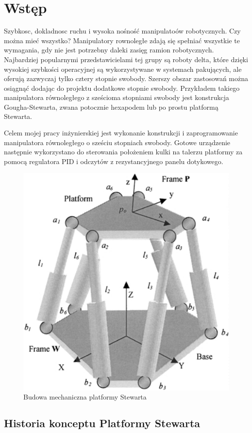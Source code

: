\newpage %


\section[Wstęp]{Wstęp}

Szybkosc, dokladnosc ruchu i wysoka nośność manipulatoów robotycznych. Czy można mieć wszystko?
Manipulatory rownoległe zdają się spełniać wszystkie te wymagania, gdy nie jest potrzebny daleki zasięg ramion robotycznych.
Najbardziej popularnymi przedstawicielami tej grupy są roboty delta, które dzięki wysokiej szybkości operacyjnej są wykorzystywane w systemach pakujących, ale oferują zazwyczaj tylko cztery stopnie swobody. Szerszy obszar zastosowań można osiągnąć dodając do projektu dodatkowe stopnie swobody. Przykładem takiego manipulatora równoległego z sześcioma stopniami swobody jest konstrukcja Gougha-Stewarta, zwana potocznie hexapodem lub po prostu platformą Stewarta.

Celem mojej pracy inżynierskiej jest wykonanie konstrukcji i zaprogramowanie manipulatora równoległego o sześciu stopniach swobody.
Gotowe urządzenie następnie wykorzystano do sterowania położeniem kulki na talerzu platformy za pomocą regulatora PID i odczytów z rezystancyjnego panelu dotykowego.




\begin{figure}[!h]
    \label{fig:anzelm}
    \centering 
    \includegraphics[width=0.4\linewidth]{img/stewart_researchgate_net.png}
    \caption{Budowa mechaniczna platformy Stewarta}
\end{figure}


\subsection{Historia konceptu Platformy Stewarta}


